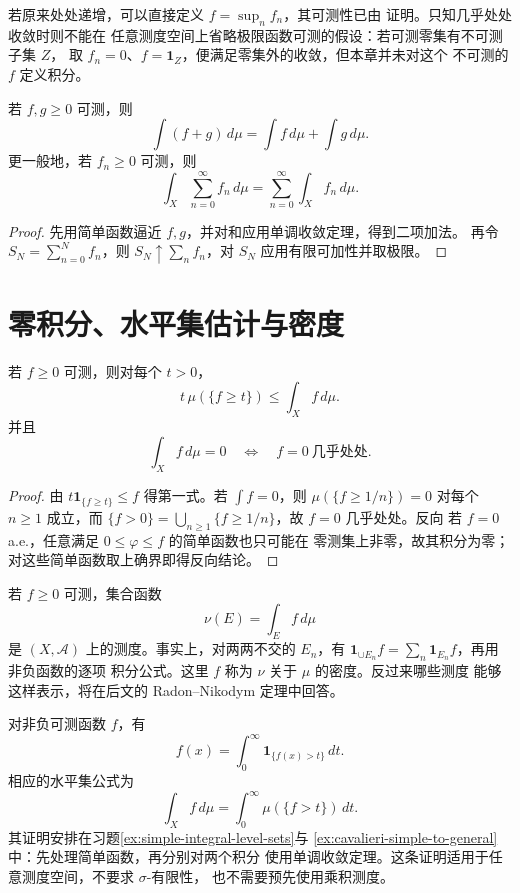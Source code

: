 若原来处处递增，可以直接定义 \(f=\sup_n f_n\)，其可测性已由
证明。只知几乎处处收敛时则不能在
任意测度空间上省略极限函数可测的假设：若可测零集有不可测子集 \(Z\)，
取 \(f_n=0\)、\(f=\mathbf1_Z\)，便满足零集外的收敛，但本章并未对这个
不可测的 \(f\) 定义积分。

\begin{corollary}[非负函数的可数可加性]
\label{cor:nonnegative-integral-additivity}
若 \(f,g\ge0\) 可测，则
\[
 \int(f+g)\,d\mu=\int f\,d\mu+\int g\,d\mu.
\]
更一般地，若 \(f_n\ge0\) 可测，则
\[
 \int_X\sum_{n=0}^{\infty}f_n\,d\mu
 =\sum_{n=0}^{\infty}\int_X f_n\,d\mu .
\]
\end{corollary}

\begin{proof}
先用简单函数逼近 \(f,g\)，并对和应用单调收敛定理，得到二项加法。
再令 \(S_N=\sum_{n=0}^{N}f_n\)，则 \(S_N\uparrow\sum_nf_n\)，对
\(S_N\) 应用有限可加性并取极限。
\end{proof}

\section{零积分、水平集估计与密度}

\begin{proposition}
\label{prop:markov-zero-integral}
若 \(f\ge0\) 可测，则对每个 \(t>0\)，
\[
 t\,\mu(\{f\ge t\})\le\int_X f\,d\mu .
\]
并且
\[
 \int_Xf\,d\mu=0\quad\Longleftrightarrow\quad f=0
 \ \text{几乎处处}.
\]
\end{proposition}

\begin{proof}
由 \(t\mathbf1_{\{f\ge t\}}\le f\) 得第一式。若 \(\int f=0\)，则
\(\mu(\{f\ge1/n\})=0\) 对每个 \(n\ge1\) 成立，而
\(\{f>0\}=\bigcup_{n\ge1}\{f\ge1/n\}\)，故 \(f=0\) 几乎处处。反向
若 \(f=0\) a.e.，任意满足 \(0\le\varphi\le f\) 的简单函数也只可能在
零测集上非零，故其积分为零；对这些简单函数取上确界即得反向结论。
\end{proof}

若 \(f\ge0\) 可测，集合函数
\[
 \nu(E)=\int_E f\,d\mu
\]
是 \((X,\mathcal A)\) 上的测度。事实上，对两两不交的 \(E_n\)，有
\(\mathbf1_{\cup E_n}f=\sum_n\mathbf1_{E_n}f\)，再用非负函数的逐项
积分公式。这里 \(f\) 称为 \(\nu\) 关于 \(\mu\) 的密度。反过来哪些测度
能够这样表示，将在后文的 Radon--Nikodym 定理中回答。

\begin{example}[层蛋糕公式的非负版本]
对非负可测函数 \(f\)，有
\[
 f(x)=\int_0^\infty\mathbf1_{\{f(x)>t\}}\,dt.
\]
相应的水平集公式为
\[
 \int_Xf\,d\mu=\int_0^\infty\mu(\{f>t\})\,dt.
\]
其证明安排在习题\ref{ex:simple-integral-level-sets}与
\ref{ex:cavalieri-simple-to-general}中：先处理简单函数，再分别对两个积分
使用单调收敛定理。这条证明适用于任意测度空间，不要求 \(\sigma\)-有限性，
也不需要预先使用乘积测度。
\end{example}

